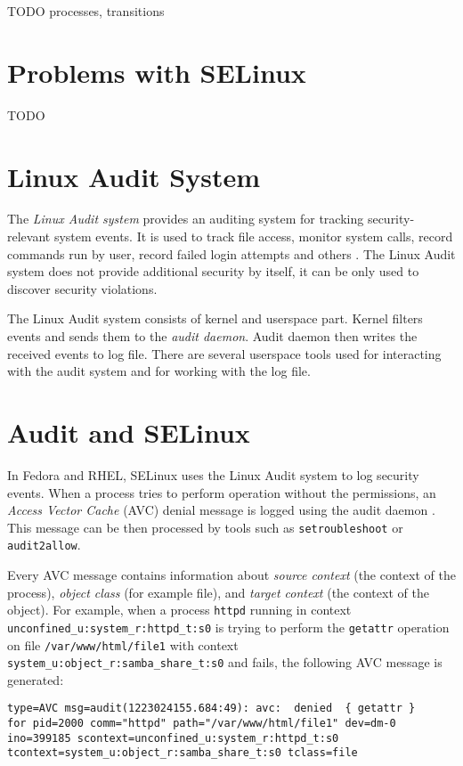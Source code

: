 TODO processes, transitions

\section{Problems with SELinux}
TODO

\section{Linux Audit System}
The \emph{Linux Audit system} provides an auditing system for tracking
security-relevant system events. It is used to track file access, monitor system
calls, record commands run by user, record failed login attempts and others
\cite{secguide}. The Linux Audit system does not provide additional security by
itself, it can be only used to discover security violations.

The Linux Audit system consists of kernel and userspace part. Kernel filters
events and sends them to the \emph{audit daemon}. Audit daemon then writes the
received events to log file. There are several userspace tools used for
interacting with the audit system and for working with the log file.

\section{Audit and SELinux}
In Fedora and RHEL, SELinux uses the Linux Audit system to log security events.
When a process tries to perform operation without the permissions, an
\emph{Access Vector Cache} (AVC) denial message is logged using the audit daemon
\cite{selinuxguide}. This message can be then processed by tools such as
\texttt{setroubleshoot} or \texttt{audit2allow}.

Every AVC message contains information about \emph{source context} (the context
of the process), \emph{object class} (for example file), and \emph{target
context} (the context of the object). For example, when a process \texttt{httpd}
running in context \texttt{unconfined\_u:system\_r:httpd\_t:s0} is trying to
perform the \texttt{getattr} operation on file \texttt{/var/www/html/file1} with
context \texttt{system\_u:object\_r:samba\_share\_t:s0} and fails, the following
AVC message is generated:

\begin{lstlisting}
type=AVC msg=audit(1223024155.684:49): avc:  denied  { getattr }
for pid=2000 comm="httpd" path="/var/www/html/file1" dev=dm-0
ino=399185 scontext=unconfined_u:system_r:httpd_t:s0
tcontext=system_u:object_r:samba_share_t:s0 tclass=file
\end{lstlisting}

